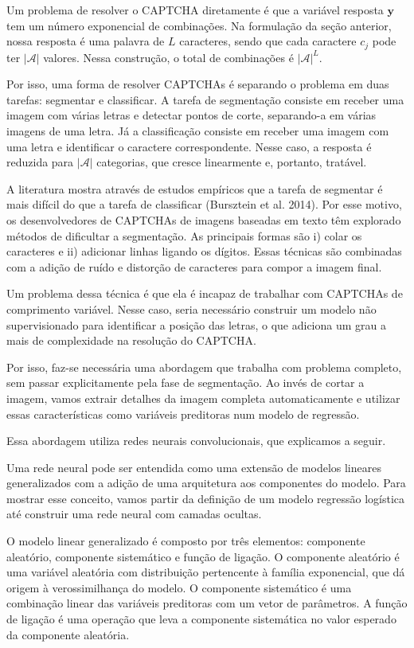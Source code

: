 \documentclass[]{elsarticle} %
\begin{document}
Um problema de resolver o CAPTCHA diretamente é que a variável resposta \(\mathbf y\) tem um número exponencial de combinações. Na formulação da seção anterior, nossa resposta é uma palavra de \(L\) caracteres, sendo que cada caractere \(c_j\) pode ter \(|\mathcal A|\) valores. Nessa construção, o total de combinações é \(|\mathcal A|^L\).

Por isso, uma forma de resolver CAPTCHAs é separando o problema em duas tarefas: segmentar e classificar. A tarefa de segmentação consiste em receber uma imagem com várias letras e detectar pontos de corte, separando-a em várias imagens de uma letra. Já a classificação consiste em receber uma imagem com uma letra e identificar o caractere correspondente. Nesse caso, a resposta é reduzida para \(|\mathcal A|\) categorias, que cresce linearmente e, portanto, tratável.

A literatura mostra através de estudos empíricos que a tarefa de segmentar é mais difícil do que a tarefa de classificar (Bursztein et al. 2014). Por esse motivo, os desenvolvedores de CAPTCHAs de imagens baseadas em texto têm explorado métodos de dificultar a segmentação. As principais formas são i) colar os caracteres e ii) adicionar linhas ligando os dígitos. Essas técnicas são combinadas com a adição de ruído e distorção de caracteres para compor a imagem final.

Um problema dessa técnica é que ela é incapaz de trabalhar com CAPTCHAs de comprimento variável. Nesse caso, seria necessário construir um modelo não supervisionado para identificar a posição das letras, o que adiciona um grau a mais de complexidade na resolução do CAPTCHA.

Por isso, faz-se necessária uma abordagem que trabalha com problema completo, sem passar explicitamente pela fase de segmentação. Ao invés de cortar a imagem, vamos extrair detalhes da imagem completa automaticamente e utilizar essas características como variáveis preditoras num modelo de regressão.

Essa abordagem utiliza redes neurais convolucionais, que explicamos a seguir.

Uma rede neural pode ser entendida como uma extensão de modelos lineares generalizados com a adição de uma arquitetura aos componentes do modelo. Para mostrar esse conceito, vamos partir da definição de um modelo regressão logística até construir uma rede neural com camadas ocultas.

O modelo linear generalizado é composto por três elementos: componente aleatório, componente sistemático e função de ligação. O componente aleatório é uma variável aleatória com distribuição pertencente à família exponencial, que dá origem à verossimilhança do modelo. O componente sistemático é uma combinação linear das variáveis preditoras com um vetor de parâmetros. A função de ligação é uma operação que leva a componente sistemática no valor esperado da componente aleatória.
\end{document}
